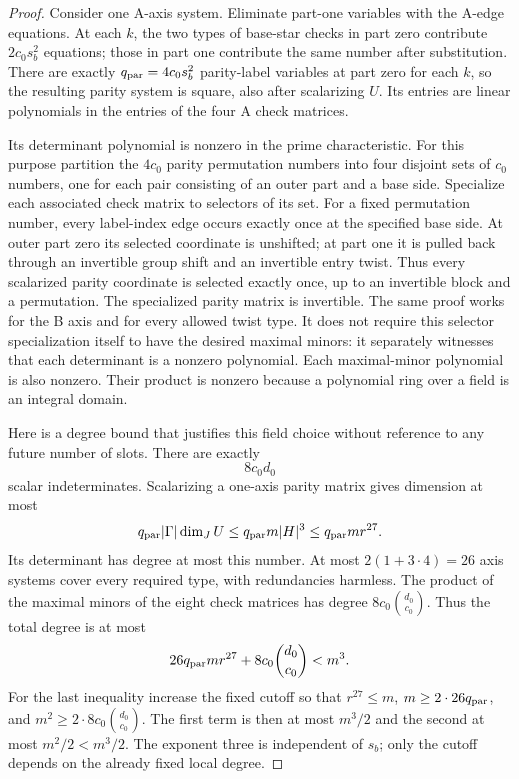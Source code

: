 \begin{proof}
Consider one A-axis system.  Eliminate part-one variables with the
A-edge equations.  At each $k$, the two types of base-star checks in
part zero contribute $2c_0s_b^2$ equations; those in part one contribute
the same number after substitution.  There are exactly
$q_{\rm par}=4c_0s_b^2$ parity-label variables at part zero for each
$k$, so the resulting parity system is square, also after scalarizing
$U$.  Its entries are linear polynomials in the entries of the four
A check matrices.

Its determinant polynomial is nonzero in the prime characteristic.
For this purpose partition the $4c_0$ parity permutation numbers into
four disjoint sets of $c_0$ numbers, one for each pair consisting of an
outer part and a base side.  Specialize each associated check matrix
to selectors of its set.  For a fixed permutation number, every
label-index edge occurs exactly once at the specified base side.
At outer part zero its selected coordinate is unshifted; at part one
it is pulled back through an invertible group shift and an invertible
entry twist.  Thus every scalarized parity coordinate is selected
exactly once, up to an invertible block and a permutation.  The
specialized parity matrix is invertible.  The same proof works for
the B axis and for every allowed twist type.  It does not require
this selector specialization itself to have the desired maximal
minors: it separately witnesses that each determinant is a nonzero
polynomial.  Each maximal-minor polynomial is also nonzero.  Their
product is nonzero because a polynomial ring over a field is an
integral domain.

Here is a degree bound that justifies this field choice without
reference to any future number of slots.  There are exactly
\begin{equation}\label{oc:number-variables}
 8c_0d_0
\end{equation}
scalar indeterminates.  Scalarizing a one-axis parity matrix gives
dimension at most
\begin{equation}\label{oc:parity-dimension}
 q_{\rm par}|\Gamma|\dim_JU
 \le q_{\rm par}m|H|^3\le q_{\rm par}mr^{27}.
\end{equation}
Its determinant has degree at most this number.  At most
$2(1+3\cdot4)=26$ axis systems cover every required type, with
redundancies harmless.  The product of the maximal minors of the
eight check matrices has degree $8c_0\binom{d_0}{c_0}$.  Thus the
total degree is at most
\begin{equation}\label{oc:determinant-degree}
 26q_{\rm par}mr^{27}+8c_0\binom{d_0}{c_0}<m^3.
\end{equation}
For the last inequality increase the fixed cutoff so that
$r^{27}\le m$, $m\ge2\cdot26q_{\rm par}$, and
$m^2\ge2\cdot8c_0\binom{d_0}{c_0}$.  The first term is then at
most $m^3/2$ and the second at most $m^2/2<m^3/2$.
The exponent three is independent of $s_b$; only the cutoff depends
on the already fixed local degree.


\end{proof}
